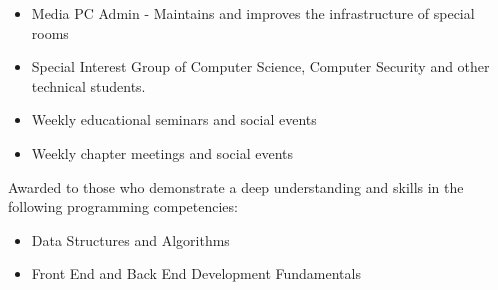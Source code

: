 \documentclass[10pt,a4paper,ragged2e,withhyper]{altacv}
\begin{document}
\begin{paracol}{2}
\begin{itemize}
\item Media PC Admin - Maintains and improves the infrastructure of special rooms
\item Special Interest Group of Computer Science, Computer Security and other technical students. 
\item Weekly educational seminars and social events
\end{itemize}

  \newline
\divider
{}
    
\begin{itemize}
\item Weekly chapter meetings and
social events
\end{itemize}
   
    \smallskip 
    
Awarded to those who demonstrate a deep understanding and skills in the following programming competencies: 
\begin{itemize}
\item Data Structures and Algorithms 
\item Front End and Back End Development Fundamentals
\end{itemize}





   
    \end{paracol}
    
 
    
    
    
\end{document}
